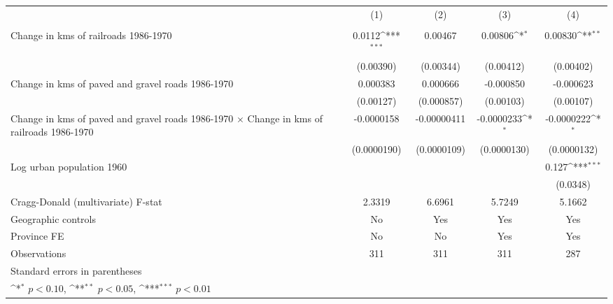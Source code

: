 {
\def\sym#1{\ifmmode^{#1}\else\(^{#1}\)\fi}
\begin{tabular}{l*{4}{c}}
\hline\hline
                &\multicolumn{1}{c}{(1)}&\multicolumn{1}{c}{(2)}&\multicolumn{1}{c}{(3)}&\multicolumn{1}{c}{(4)}\\
                &\multicolumn{1}{c}{}&\multicolumn{1}{c}{}&\multicolumn{1}{c}{}&\multicolumn{1}{c}{}\\
\hline
Change in kms of railroads 1986-1970&   0.0112\sym{***}&  0.00467         &  0.00806\sym{*}  &  0.00830\sym{**} \\
                &(0.00390)         &(0.00344)         &(0.00412)         &(0.00402)         \\
[1em]
Change in kms of paved and gravel roads 1986-1970& 0.000383         & 0.000666         &-0.000850         &-0.000623         \\
                &(0.00127)         &(0.000857)         &(0.00103)         &(0.00107)         \\
[1em]
Change in kms of paved and gravel roads 1986-1970 $\times$ Change in kms of railroads 1986-1970&-0.0000158         &-0.00000411         &-0.0000233\sym{*}  &-0.0000222\sym{*}  \\
                &(0.0000190)         &(0.0000109)         &(0.0000130)         &(0.0000132)         \\
[1em]
Log urban population 1960&                  &                  &                  &    0.127\sym{***}\\
                &                  &                  &                  & (0.0348)         \\
\hline
Cragg-Donald (multivariate) F-stat&   2.3319         &   6.6961         &   5.7249         &   5.1662         \\
Geographic controls&       No         &      Yes         &      Yes         &      Yes         \\
Province FE     &       No         &       No         &      Yes         &      Yes         \\
Observations    &      311         &      311         &      311         &      287         \\
\hline\hline
\multicolumn{5}{l}{\footnotesize Standard errors in parentheses}\\
\multicolumn{5}{l}{\footnotesize \sym{*} \(p<0.10\), \sym{**} \(p<0.05\), \sym{***} \(p<0.01\)}\\
\end{tabular}
}
